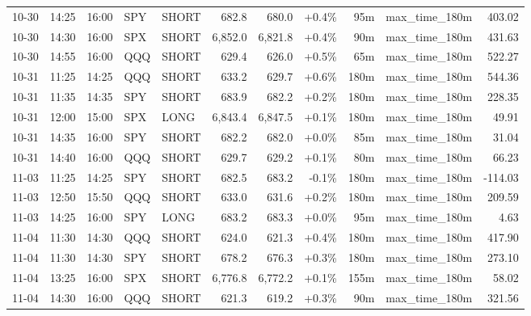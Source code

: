 \documentclass[11pt,a4paper,twoside]{article}
\begin{document}
\begin{center}
\begin{longtable}{>{\color{txtmain}}l l l l l r r r r >{\color{txtmain}}l r}
10-30 & 14:25 & 16:00 & SPY & SHORT & 682.8 & 680.0 & \textcolor{wingreen}{+0.4\%} & 95m & max\_time\_180m & \textcolor{wingreen}{403.02} \\
10-30 & 14:30 & 16:00 & SPX & SHORT & 6,852.0 & 6,821.8 & \textcolor{wingreen}{+0.4\%} & 90m & max\_time\_180m & \textcolor{wingreen}{431.63} \\
10-30 & 14:55 & 16:00 & QQQ & SHORT & 629.4 & 626.0 & \textcolor{wingreen}{+0.5\%} & 65m & max\_time\_180m & \textcolor{wingreen}{522.27} \\
10-31 & 11:25 & 14:25 & QQQ & SHORT & 633.2 & 629.7 & \textcolor{wingreen}{+0.6\%} & 180m & max\_time\_180m & \textcolor{wingreen}{544.36} \\
10-31 & 11:35 & 14:35 & SPY & SHORT & 683.9 & 682.2 & \textcolor{wingreen}{+0.2\%} & 180m & max\_time\_180m & \textcolor{wingreen}{228.35} \\
10-31 & 12:00 & 15:00 & SPX & LONG & 6,843.4 & 6,847.5 & \textcolor{wingreen}{+0.1\%} & 180m & max\_time\_180m & \textcolor{wingreen}{49.91} \\
10-31 & 14:35 & 16:00 & SPY & SHORT & 682.2 & 682.0 & \textcolor{wingreen}{+0.0\%} & 85m & max\_time\_180m & \textcolor{wingreen}{31.04} \\
10-31 & 14:40 & 16:00 & QQQ & SHORT & 629.7 & 629.2 & \textcolor{wingreen}{+0.1\%} & 80m & max\_time\_180m & \textcolor{wingreen}{66.23} \\
11-03 & 11:25 & 14:25 & SPY & SHORT & 682.5 & 683.2 & \textcolor{lossred}{-0.1\%} & 180m & max\_time\_180m & \textcolor{lossred}{-114.03} \\
11-03 & 12:50 & 15:50 & QQQ & SHORT & 633.0 & 631.6 & \textcolor{wingreen}{+0.2\%} & 180m & max\_time\_180m & \textcolor{wingreen}{209.59} \\
11-03 & 14:25 & 16:00 & SPY & LONG & 683.2 & 683.3 & \textcolor{wingreen}{+0.0\%} & 95m & max\_time\_180m & \textcolor{wingreen}{4.63} \\
11-04 & 11:30 & 14:30 & QQQ & SHORT & 624.0 & 621.3 & \textcolor{wingreen}{+0.4\%} & 180m & max\_time\_180m & \textcolor{wingreen}{417.90} \\
11-04 & 11:30 & 14:30 & SPY & SHORT & 678.2 & 676.3 & \textcolor{wingreen}{+0.3\%} & 180m & max\_time\_180m & \textcolor{wingreen}{273.10} \\
11-04 & 13:25 & 16:00 & SPX & SHORT & 6,776.8 & 6,772.2 & \textcolor{wingreen}{+0.1\%} & 155m & max\_time\_180m & \textcolor{wingreen}{58.02} \\
11-04 & 14:30 & 16:00 & QQQ & SHORT & 621.3 & 619.2 & \textcolor{wingreen}{+0.3\%} & 90m & max\_time\_180m & \textcolor{wingreen}{321.56} \\

\end{longtable}
\end{center}
\end{document}

